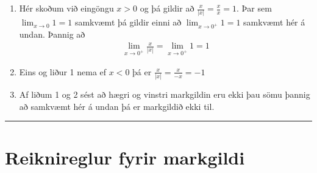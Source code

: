 \documentclass[b5paper,10pt,icelandic]{sphinxmanual}
\begin{document}
\noindent{}
\begin{enumerate}
\item {} 
Hér skoðum við eingöngu \(x>0\) og þá gildir að
\(\frac x{|x|} = \frac xx = 1\). Þar sem
\(\lim_{x \to 0} 1 = 1\) samkvæmt {\hyperref[\detokenize{kafli02:daemi2-1}]{}}
þá gildir einni að \(\lim_{x \to 0^+} 1 = 1\) samkvæmt
{\hyperref[\detokenize{kafli02:setning-hv-markgildi}]{}}
hér á undan. Þannig að
\begin{equation*}
\begin{split}\lim_{x \to 0^+} \frac x{|x|} =
\lim_{x \to 0^+} 1 = 1\end{split}
\end{equation*}
\item {} 
Eins og liður 1 nema ef \(x<0\) þá er
\(\frac x{|x|} = \frac x{-x} = -1\)

\item {} 
Af liðum 1 og 2 sést að hægri og vinstri markgildin eru ekki þau sömu þannig
að samkvæmt {\hyperref[\detokenize{kafli02:setning-hv-markgildi}]{}} hér á undan þá er
markgildið ekki til.

\end{enumerate}


\bigskip\hrule\bigskip



\section{Reiknireglur fyrir markgildi}
\label{\detokenize{kafli02:reiknireglur-fyrir-markgildi}}
\end{document}
